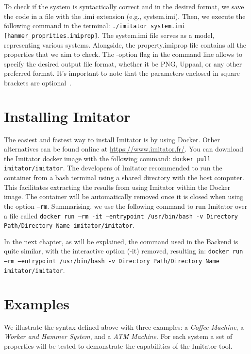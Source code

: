 To check if the system is syntactically correct and in the desired format, we save the code in a file with the .imi extension (e.g., system.imi). Then, we execute the following command in the terminal: \texttt{./imitator system.imi [hammer\_proprities.imiprop]}. The system.imi file serves as a model, representing various systems. Alongside, the property.imiprop file contains all the properties that we aim to check. The -option flag in the command line allows to specify the desired output file format, whether it be PNG, Uppaal, or any other preferred format. It's important to note that the parameters enclosed in square brackets are optional~\cite{IMITATOR}.

\section{Installing Imitator}
The easiest and fastest way to install Imitator is by using Docker. Other alternatives can be found online at \url{https://www.imitator.fr/}. You can download the Imitator docker image with the following command: \texttt{docker pull imitator/imitator}. The developers of Imitator recommended to run the container from a bash terminal using a shared directory with the host computer. This facilitates extracting the results from using Imitator within the Docker image.
The container will be automatically removed once it is closed when using the option \texttt{--rm}. Summarising, we use the following command to run Imitator over a file called 
\texttt{docker run --rm -it --entrypoint
/usr/bin/bash -v Directory Path/Directory Name imitator/imitator}.

In the next chapter, as will be explained, the command used in the Backend is quite similar, with the interactive option (-it) removed, resulting in: \texttt{docker run --rm --entrypoint /usr/bin/bash -v Directory Path/Directory Name imitator/imitator}.


\section{Examples}\label{sec:examples}

We illustrate the syntax defined above with three examples:
a \emph{Coffee Machine}, a \emph{Worker and Hammer System}, and a \emph{ATM Machine}. For each system a set of properties will be tested to demonstrate the capabilities of the Imitator tool.

